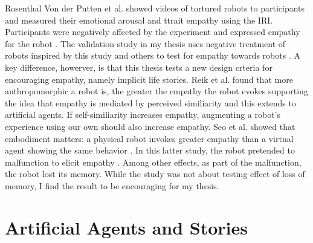 Rosenthal Von der Putten et al. showed videos of tortured robots to participants and measured their emotional arousal and ttrait empathy using the IRI. Participants were negatively affected by the experiment and expressed empathy for the robot \cite{rosenthal_emotional_reaction}. The validation study in my thesis uses negative treatment of robots inspired by this study and others to test for empathy towards robots \cite{bartneck_daisy_daisy} \cite{verbunt_mockingbird_robot}. A key difference, howerver, is that this thesis tests a new design crteria for encouraging empathy, namely implicit life stories. Reik et al. found that more anthropomorphic a robot is, the greater the empathy the robot evokes supporting the idea that empathy is mediated by perceived similiarity and this extends to artificial agents. If self-similiarity increases empathy, augmenting a robot's experience using our own should also increase empathy. Seo et al. showed that embodiment matters: a physical robot invokes greater empathy than a 
virtual agent showing the same behavior \cite{seo_empathy_virtual_physical}. In this latter study, the robot pretended to malfunction to elicit empathy . Among other effects, as part of the malfunction, the robot lost its memory. While the study was not about testing effect of loss of memory, I find the result to be encouraging for my thesis. 








\section{Artificial Agents and Stories}



